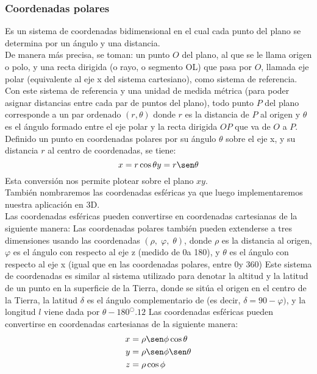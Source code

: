 \documentclass[12tp]{article}
\begin{document}
\subsubsection{Coordenadas polares}
Es un sistema de coordenadas bidimensional en el cual cada punto del plano se determina por un ángulo y una distancia.\\
De manera más precisa, se toman: un punto $O$ del plano, al que se le llama origen o polo, y una recta dirigida (o rayo, o segmento OL) 
que pasa por $O$, llamada eje polar (equivalente al eje x del sistema cartesiano), como sistema de referencia. Con este 
sistema de referencia y una unidad de medida métrica (para poder asignar distancias entre cada par de puntos del plano), todo 
punto $P$ del plano corresponde a un par ordenado $(r, \theta)$ donde $r$ es la distancia de $P$ al origen y $\theta$ es el 
ángulo formado entre el eje polar y la recta dirigida $OP$ que va de $O$ a $P$.\\
Definido un punto en coordenadas polares por su ángulo $\theta$ sobre el eje x, y su distancia $r$ al centro de coordenadas, 
se tiene:
\begin{equation}
x= r \cos \theta \\
y= r \sen \theta    
\end{equation}
Esta conversión nos permite plotear sobre el plano $xy$.\\
También nombraremos las coordenadas esféricas ya que luego implementaremos nuestra aplicación en 3D.\\
Las coordenadas esféricas pueden convertirse en coordenadas cartesianas de la siguiente manera:
Las coordenadas polares también pueden extenderse a tres dimensiones usando las coordenadas $(\rho,\; \varphi,\; \theta)$, 
donde $\rho$ es la distancia al origen, $\varphi$ es el ángulo con respecto al eje z (medido de 0\textordmasculine a 180\textordmasculine), 
y $\theta$ es el ángulo con respecto al eje x (igual que en las coordenadas polares, entre 0\textordmasculine y 360\textordmasculine) Este sistema de 
coordenadas es similar al sistema utilizado para denotar la altitud y la latitud de un punto en la superficie de la Tierra, 
donde se sitúa el origen en el centro de la Tierra, la latitud $\delta$ es el ángulo complementario de \varphi (es decir, $\delta = 90 − \varphi)$, y la 
longitud $l$ viene dada por $\theta − 180^\bigcirc .12$
Las coordenadas esféricas pueden convertirse en coordenadas cartesianas de la siguiente manera:
\begin{equation*}
\begin{split}
x &= \rho  \sen\phi  \cos\theta \\
y &= \rho  \sen\phi  \sen\theta \\
z &= \rho  \cos\phi
\end{split}
\end{equation*}
\begin{center}
\end{center}
\end{document}
